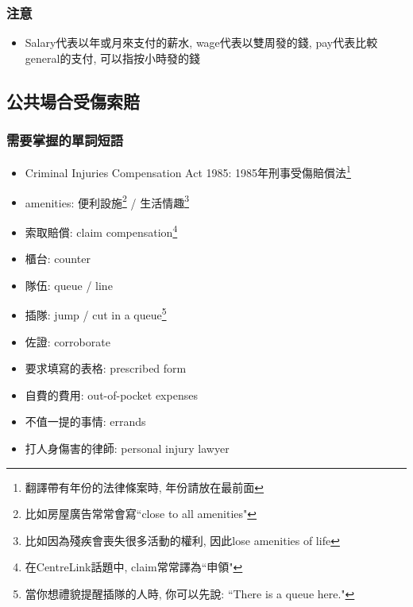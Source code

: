\subsubsection*{注意}
\begin{itemize}
  \itemsep0em
  \item Salary代表以年或月來支付的薪水, wage代表以雙周發的錢, pay代表比較general的支付, 可以指按小時發的錢
\end{itemize}

\subsection{公共場合受傷索賠}
\subsubsection*{需要掌握的單詞短語}
\begin{multicols}{2}
\begin{itemize}
  \itemsep0em
  \item Criminal Injuries Compensation Act 1985: 1985年刑事受傷賠償法\footnote{翻譯帶有年份的法律條案時, 年份請放在最前面}
  \item amenities: 便利設施\footnote{比如房屋廣告常常會寫``close to all amenities"} / 生活情趣\footnote{比如因為殘疾會喪失很多活動的權利, 因此lose amenities of life}
  \item 索取賠償: claim compensation\footnote{在CentreLink話題中, claim常常譯為``申領"}
  \item 櫃台: counter
  \item 隊伍: queue / line
  \item 插隊: jump / cut in a queue\footnote{當你想禮貌提醒插隊的人時, 你可以先說: ``There is a queue here."}
  \item 佐證: corroborate
  \item 要求填寫的表格: prescribed form
  \item 自費的費用: out-of-pocket expenses
  \item 不值一提的事情: errands
  \item 打人身傷害的律師: personal injury lawyer
\end{itemize}
\end{multicols}

